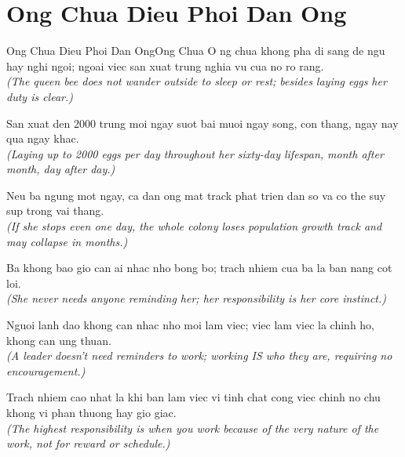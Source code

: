 \section{Ong Chua Dieu Phoi Dan Ong}
\begin{truyen}{Ong Chua Dieu Phoi Dan Ong}{Ong Chua}
O ng chua khong pha di sang de ngu hay nghi ngoi; ngoai viec san xuat trung nghia vu cua no ro rang.\\
\textit{(The queen bee does not wander outside to sleep or rest; besides laying eggs her duty is clear.)}

San xuat den 2000 trung moi ngay suot bai muoi ngay song, con thang, ngay nay qua ngay khac.\\
\textit{(Laying up to 2000 eggs per day throughout her sixty-day lifespan, month after month, day after day.)}

Neu ba ngung mot ngay, ca dan ong mat track phat trien dan so va co the suy sup trong vai thang.\\
\textit{(If she stops even one day, the whole colony loses population growth track and may collapse in months.)}

Ba khong bao gio can ai nhac nho bong bo; trach nhiem cua ba la ban nang cot loi.\\
\textit{(She never needs anyone reminding her; her responsibility is her core instinct.)}

Nguoi lanh dao khong can nhac nho moi lam viec; viec lam viec la chinh ho, khong can ung thuan.\\
\textit{(A leader doesn't need reminders to work; working IS who they are, requiring no encouragement.)}

\end{truyen}
\begin{baihoc}
  Trach nhiem cao nhat la khi ban lam viec vi tinh chat cong viec chinh no chu khong vi phan thuong hay gio giac.\\
  \textit{(The highest responsibility is when you work because of the very nature of the work, not for reward or schedule.)}
\end{baihoc}

